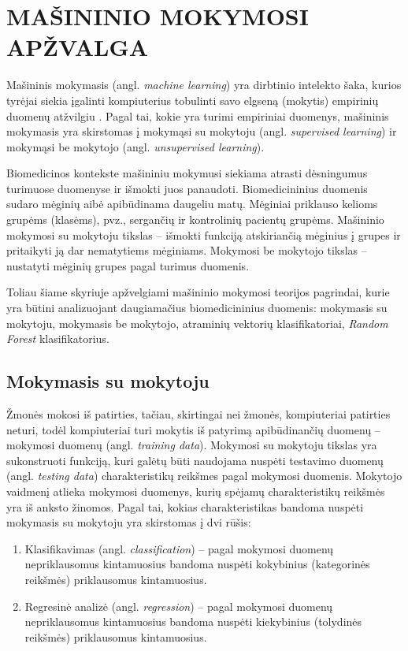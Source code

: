 \section{MAŠININIO MOKYMOSI APŽVALGA}
\label{darbu_apzvalga}

Mašininis mokymasis (angl. \textit{machine learning}) yra dirbtinio intelekto šaka, kurios tyrėjai siekia įgalinti kompiuterius tobulinti savo elgseną (mokytis) empirinių duomenų atžvilgiu \cite{duda2001pattern}. Pagal tai, kokie yra turimi empiriniai duomenys, mašininis mokymasis yra skirstomas į mokymąsi su mokytoju (angl. \textit{supervised learning}) ir mokymąsi be mokytojo (angl. \textit{unsupervised learning}).

Biomedicinos kontekste mašininiu mokymusi siekiama atrasti dėsningumus turimuose duomenyse ir išmokti juos panaudoti. Biomedicininius duomenis sudaro mėginių aibė apibūdinama daugeliu matų. Mėginiai priklauso kelioms grupėms (klasėms), pvz., sergančių ir kontrolinių pacientų grupėms. Mašininio mokymosi su mokytoju tikslas -- išmokti funkciją atskiriančią mėginius į grupes ir pritaikyti ją dar nematytiems mėginiams. Mokymosi be mokytojo tikslas -- nustatyti mėginių grupes pagal turimus duomenis.

 Toliau šiame skyriuje apžvelgiami mašininio mokymosi teorijos pagrindai, kurie yra būtini analizuojant daugiamačius biomedicininius duomenis: mokymasis su mokytoju, mokymasis be mokytojo, atraminių vektorių klasifikatoriai, \textit{Random Forest} klasifikatorius.

\subsection{Mokymasis su mokytoju}

Žmonės mokosi iš patirties, tačiau, skirtingai nei žmonės, kompiuteriai patirties neturi, todėl kompiuteriai turi mokytis iš patyrimą apibūdinančių duomenų -- mokymosi duomenų (angl. \textit{training data}). Mokymosi su mokytoju tikslas yra sukonstruoti funkciją, kuri galėtų būti naudojama nuspėti testavimo duomenų (angl. \textit{testing data}) charakteristikų reikšmes pagal mokymosi duomenis. Mokytojo vaidmenį atlieka mokymosi duomenys, kurių spėjamų charakteristikų reikšmės yra iš anksto žinomos. Pagal tai, kokias charakteristikas bandoma nuspėti mokymasis su mokytoju yra skirstomas į dvi rūšis:
\begin{enumerate}
  \item Klasifikavimas (angl. \textit{classification}) -- pagal mokymosi duomenų nepriklausomus kintamuosius bandoma nuspėti kokybinius (kategorinės reikšmės) priklausomus kintamuosius.
  \item Regresinė analizė (angl. \textit{regression}) -- pagal mokymosi duomenų nepriklausomus kintamuosius bandoma nuspėti kiekybinius (tolydinės reikšmės) priklausomus kintamuosius.
\end{enumerate} 

